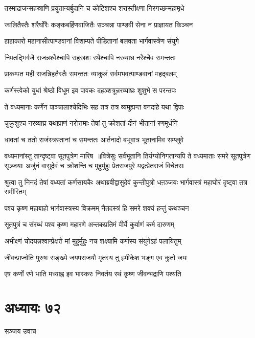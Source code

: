 \twolineshloka
{तस्माद्राजन्सहस्राणि प्रयुतान्यर्बुदानि च}
{कोटिशश्च शरास्तीक्ष्णा निरगच्छन्महामृधे}


\twolineshloka
{ज्वलितैस्तैः शरैर्घोरैः कङ्कबर्हिणवाजितैः}
{सञ्चन्ना पाण्डवी सेना न प्राज्ञायत किञ्चन}


\twolineshloka
{हाहाकारो महानासीत्पाण्डवानां विशाम्पते}
{पीडितानां बलवता भार्गवास्त्रेण संयुगे}


\twolineshloka
{निपतद्भिर्गजै राजन्नश्वैश्चापि सहस्रशः}
{रथैश्चापि नरव्याघ्र नरैश्चैव समन्ततः}


\twolineshloka
{प्राकम्पत मही राजन्निहतैस्तैः समन्ततः}
{व्याकुलं सर्वमभवत्पाण्डवानां महद्बलम्}


\twolineshloka
{कर्णस्त्वेको युधां श्रेष्ठो विधूम इव पावकः}
{दहञ्शत्रून्नरव्याघ्रः शुशुभे स परन्तपः}


\twolineshloka
{ते वध्यमानाः कर्णेन पाञ्चालाश्चेदिभिः सह}
{तत्र तत्र व्यमुह्यन्त वनदाहे यथा द्विपाः}


\twolineshloka
{चुक्रुशुश्च नरव्याघ्र यथाप्राणं नरोत्तमाः}
{तेषां तु क्रोशतां दीनं भीतानां रणमूर्धनि}


\twolineshloka
{धावतां च ततो राजंस्त्रस्तानां च समन्ततः}
{आर्तनादो बभूवात्र भूतानामिव सम्प्लुवे}


वध्यमानांस्तु तान्दृष्ट्वा सूतपुत्रेण मारिष ॥वित्रेसुः सर्वभूतानि तिर्यग्योनिगतान्यपि
\threelineshloka
{ते वध्यमाताः समरे सूतपुत्रेण सृञ्जयाः}
{अर्जुनं वासुदेवं च क्रोशन्ति च मुहुर्मुहुः}
{प्रेतराजपुरे यद्वत्प्रेतराजं विचेतसः}


\threelineshloka
{श्रुत्वा तु निनदं तेषां वध्यतां कर्णसायकैः}
{अथाब्रवीद्वासुदेवं कुन्तीपुत्रो धऩञ्जयः}
{भार्गवास्त्रं महाघोरं दृष्ट्वा तत्र समीरितम्}


\twolineshloka
{पश्य कृष्ण महाबाहो भार्गवास्त्रस्य विक्रमम्}
{नैतदस्त्रं हि समरे शक्यं हन्तुं कथञ्चन}


\twolineshloka
{सूतपुत्रं च संरब्धं पश्य कृष्ण महारणे}
{अन्तकप्रतिमं वीर्ये कुर्वाणं कर्म दारुणम्}


\twolineshloka
{अभीक्ष्णं चोदयन्नश्वान्प्रेक्षते मां मुहुर्मुहुः}
{नच शक्ष्यामि कर्णस्य संयुगेऽहं पलायितुम्}


\twolineshloka
{जीवन्प्राप्नोति पुरुषः सङ्ख्ये जयपराजयौ}
{मृतस्य तु हृपीकेश भङ्ग एव कुतो जयः}


\twolineshloka
{एष कर्णो रणे भाति मध्याह्न इव भास्करः}
{निवर्तय रथं कृष्ण जीवन्भद्राणि पश्यति}


\chapter{अध्यायः ७२}
\twolineshloka
{सञ्जय उवाच}
{}


